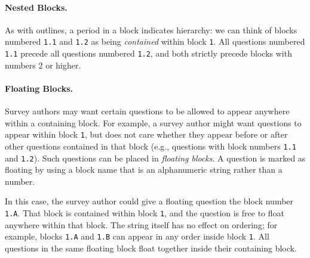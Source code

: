 \paragraph{Nested Blocks.}
As with outlines, a period in a block indicates hierarchy: we can think of blocks
numbered \texttt{1.1} and \texttt{1.2} as being \emph{contained} within block
\texttt{1}. All questions numbered \texttt{1.1} precede all questions
numbered \texttt{1.2}, and both strictly precede blocks with numbers 2
or higher.

\paragraph{Floating Blocks.}
Survey authors may want certain questions to be allowed to appear anywhere
within a containing block. For example, a survey author might want
questions to appear within block \texttt{1}, but does not care whether
they appear before or after other questions contained in that block
(e.g., questions with block numbers \texttt{1.1} and
\texttt{1.2}). Such questions can be placed in \emph{floating
  blocks}. A question is marked as floating by using a
block name that is an alphanumeric string rather than a number.

In this case, the survey author could give a floating question the
block number \texttt{1.A}. That block is contained within block
\texttt{1}, and the question is free to float anywhere within that
block. The string itself has no effect on ordering; for example,
blocks \texttt{1.A} and \texttt{1.B} can appear in any order inside
block \texttt{1}. All questions in the same floating block float
together inside their containing block.

